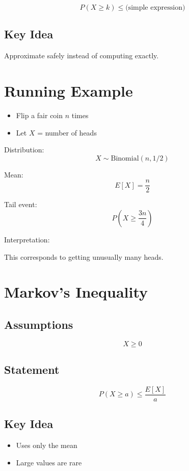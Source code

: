 \documentclass[12pt]{article}
\begin{document}
\[
P(X \ge k) \le \text{(simple expression)}
\]

\subsection{Key Idea}

Approximate safely instead of computing exactly.

\section{Running Example}

\begin{itemize}
    \item Flip a fair coin $n$ times
    \item Let $X$ = number of heads
\end{itemize}

Distribution:
\[
X \sim \text{Binomial}(n, 1/2)
\]

Mean:
\[
E[X] = \frac{n}{2}
\]

Tail event:
\[
P\left(X \ge \frac{3n}{4}\right)
\]

Interpretation:

This corresponds to getting unusually many heads.
\newpage
\section{Markov's Inequality}

\subsection{Assumptions}

\[
X \ge 0
\]

\subsection{Statement}

\[
P(X \ge a) \le \frac{E[X]}{a}
\]

\subsection{Key Idea}

\begin{itemize}
    \item Uses only the mean
    \item Large values are rare
\end{itemize}
\end{document}
